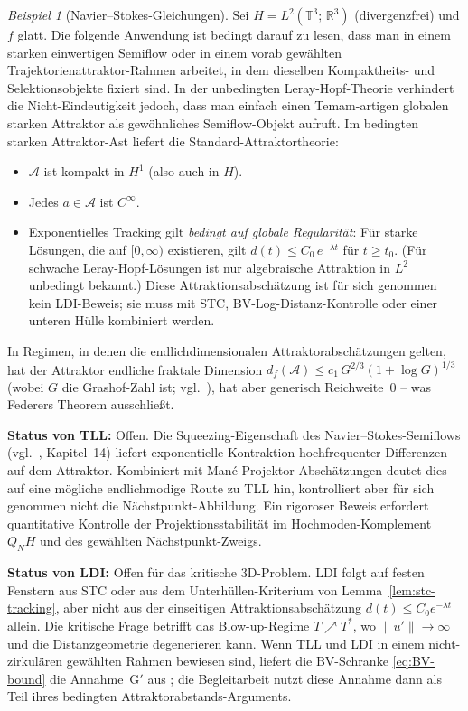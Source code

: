 \documentclass[12pt,a4paper]{article}
\theoremstyle{definition}
\theoremstyle{plain}
\theoremstyle{remark}
\newtheorem{example}[definition]{Beispiel}
\begin{document}
\begin{example}[Navier--Stokes-Gleichungen]
\label{ex:NS}
Sei $H = L^2(\mathbb{T}^3;\,\mathbb{R}^3)$ (divergenzfrei) und
$f$ glatt. Die folgende Anwendung ist bedingt darauf zu lesen, dass
man in einem starken einwertigen Semiflow oder in einem vorab
gewählten Trajektorienattraktor-Rahmen arbeitet, in dem dieselben
Kompaktheits- und Selektionsobjekte fixiert sind. In der unbedingten
Leray-Hopf-Theorie verhindert die Nicht-Eindeutigkeit jedoch, dass man einfach einen
Temam-artigen globalen starken Attraktor als gewöhnliches
Semiflow-Objekt aufruft. Im bedingten starken Attraktor-Ast liefert
die Standard-Attraktortheorie:
\begin{itemize}
  \item $\mathcal{A}$ ist kompakt in $H^1$ (also auch in $H$).
  \item Jedes $a \in \mathcal{A}$ ist $C^\infty$.
  \item Exponentielles Tracking gilt \emph{bedingt auf globale
    Regularität}: Für starke Lösungen, die auf $[0,\infty)$
    existieren, gilt $d(t) \le C_0\,e^{-\lambda t}$ für $t \ge t_0$.
    (Für schwache Leray-Hopf-Lösungen ist nur algebraische
    Attraktion in $L^2$ unbedingt bekannt.)  Diese Attraktionsabschätzung
    ist für sich genommen kein LDI-Beweis; sie muss mit STC,
    BV-Log-Distanz-Kontrolle oder einer unteren Hülle kombiniert werden.
\end{itemize}

In Regimen, in denen die endlichdimensionalen Attraktorabschätzungen
gelten, hat der Attraktor endliche fraktale Dimension
$d_f(\mathcal{A}) \le c_1\,G^{2/3}(1+\log G)^{1/3}$
(wobei $G$ die Grashof-Zahl ist;
vgl.~\cite{ConstantinFoiasTemam1985}), hat aber generisch
Reichweite~$0$ -- was Federers Theorem ausschließt.

\medskip\noindent
\textbf{Status von TLL:}\; Offen.  Die Squeezing-Eigenschaft des
Navier--Stokes-Semiflows (vgl.~\cite{FoiasManleyRosaTemam2001},
Kapitel~14) liefert exponentielle Kontraktion hochfrequenter
Differenzen auf dem Attraktor. Kombiniert mit
Mané-Projektor-Abschätzungen deutet dies auf eine mögliche
endlichmodige Route zu TLL hin, kontrolliert aber für sich genommen
nicht die Nächstpunkt-Abbildung. Ein rigoroser Beweis erfordert
quantitative Kontrolle der Projektionsstabilität im
Hochmoden-Komplement $Q_N H$ und des gewählten Nächstpunkt-Zweigs.

\medskip\noindent
\textbf{Status von LDI:}\; Offen für das kritische 3D-Problem.
LDI folgt auf festen Fenstern aus STC oder aus dem Unterhüllen-Kriterium
von Lemma~\ref{lem:stc-tracking}, aber nicht aus der einseitigen
Attraktionsabschätzung $d(t)\le C_0e^{-\lambda t}$ allein.  Die
kritische Frage betrifft das Blow-up-Regime $T \nearrow T^*$, wo
$\|u'\| \to \infty$ und die Distanzgeometrie degenerieren kann.
Wenn TLL und LDI in einem nicht-zirkulären gewählten Rahmen
bewiesen sind, liefert die BV-Schranke \eqref{eq:BV-bound}
die Annahme~G$'$ aus \cite{FST-NS2026}; die Begleitarbeit nutzt diese
Annahme dann als Teil ihres bedingten Attraktorabstands-Arguments.


\end{example}
\end{document}
